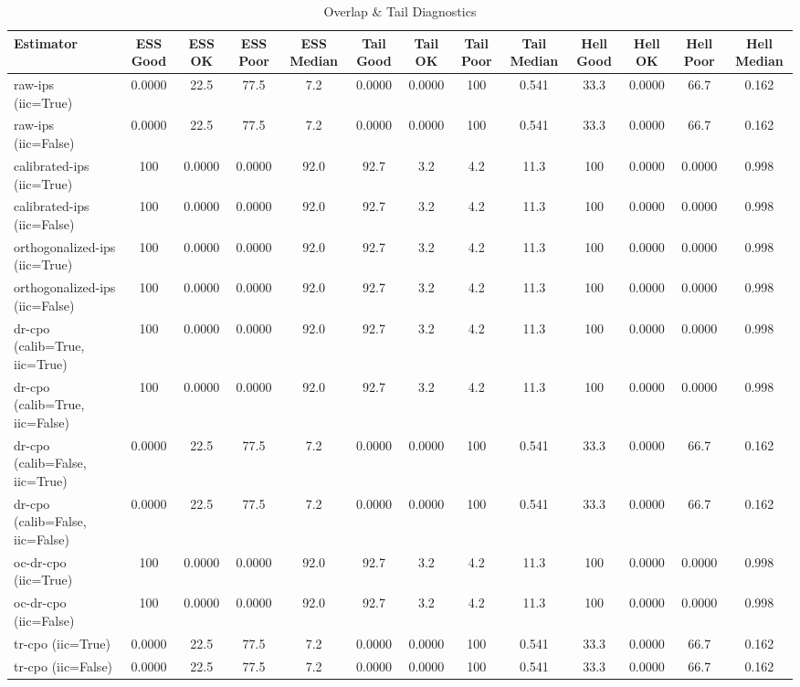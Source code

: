 \begin{table}[htbp]
\centering
\caption{Overlap & Tail Diagnostics}
\label{tab:A3}
\begin{tabular}{l|cccccccccccc}
\toprule
Estimator & ESS Good & ESS OK & ESS Poor & ESS Median & Tail Good & Tail OK & Tail Poor & Tail Median & Hell Good & Hell OK & Hell Poor & Hell Median \\
\midrule
raw-ips (iic=True) & 0.0000 & 22.5 & 77.5 & 7.2 & 0.0000 & 0.0000 & 100 & 0.541 & 33.3 & 0.0000 & 66.7 & 0.162 \\
raw-ips (iic=False) & 0.0000 & 22.5 & 77.5 & 7.2 & 0.0000 & 0.0000 & 100 & 0.541 & 33.3 & 0.0000 & 66.7 & 0.162 \\
calibrated-ips (iic=True) & 100 & 0.0000 & 0.0000 & 92.0 & 92.7 & 3.2 & 4.2 & 11.3 & 100 & 0.0000 & 0.0000 & 0.998 \\
calibrated-ips (iic=False) & 100 & 0.0000 & 0.0000 & 92.0 & 92.7 & 3.2 & 4.2 & 11.3 & 100 & 0.0000 & 0.0000 & 0.998 \\
orthogonalized-ips (iic=True) & 100 & 0.0000 & 0.0000 & 92.0 & 92.7 & 3.2 & 4.2 & 11.3 & 100 & 0.0000 & 0.0000 & 0.998 \\
orthogonalized-ips (iic=False) & 100 & 0.0000 & 0.0000 & 92.0 & 92.7 & 3.2 & 4.2 & 11.3 & 100 & 0.0000 & 0.0000 & 0.998 \\
dr-cpo (calib=True, iic=True) & 100 & 0.0000 & 0.0000 & 92.0 & 92.7 & 3.2 & 4.2 & 11.3 & 100 & 0.0000 & 0.0000 & 0.998 \\
dr-cpo (calib=True, iic=False) & 100 & 0.0000 & 0.0000 & 92.0 & 92.7 & 3.2 & 4.2 & 11.3 & 100 & 0.0000 & 0.0000 & 0.998 \\
dr-cpo (calib=False, iic=True) & 0.0000 & 22.5 & 77.5 & 7.2 & 0.0000 & 0.0000 & 100 & 0.541 & 33.3 & 0.0000 & 66.7 & 0.162 \\
dr-cpo (calib=False, iic=False) & 0.0000 & 22.5 & 77.5 & 7.2 & 0.0000 & 0.0000 & 100 & 0.541 & 33.3 & 0.0000 & 66.7 & 0.162 \\
oc-dr-cpo (iic=True) & 100 & 0.0000 & 0.0000 & 92.0 & 92.7 & 3.2 & 4.2 & 11.3 & 100 & 0.0000 & 0.0000 & 0.998 \\
oc-dr-cpo (iic=False) & 100 & 0.0000 & 0.0000 & 92.0 & 92.7 & 3.2 & 4.2 & 11.3 & 100 & 0.0000 & 0.0000 & 0.998 \\
tr-cpo (iic=True) & 0.0000 & 22.5 & 77.5 & 7.2 & 0.0000 & 0.0000 & 100 & 0.541 & 33.3 & 0.0000 & 66.7 & 0.162 \\
tr-cpo (iic=False) & 0.0000 & 22.5 & 77.5 & 7.2 & 0.0000 & 0.0000 & 100 & 0.541 & 33.3 & 0.0000 & 66.7 & 0.162 \\

\end{tabular}
\end{table}

